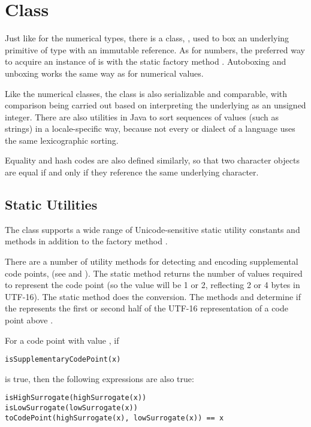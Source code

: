 \section{ Class}\label{section:character-class}

Just like for the numerical types, there is a class,
, used to box an underlying primitive
of type  with an immutable reference.  As for numbers, the
preferred way to acquire an instance of  is with the
static factory method .  Autoboxing and
unboxing works the same way as for numerical values.  

Like the numerical classes, the  class is also
serializable and comparable, with comparison being carried out based
on interpreting the underlying  as an unsigned integer.
There are also utilities in Java to sort sequences of 
values (such as strings) in a locale-specific way, because not every
or dialect of a language uses the same lexicographic sorting.

Equality and hash codes are also defined similarly, so that two
character objects are equal if and only if they reference the same
underlying character.

\subsection{Static Utilities}\label{section:char-character-utils}

The  class supports a wide range of Unicode-sensitive
static utility constants and methods in addition to the factory method
.

There are a number of utility methods for detecting and encoding
supplemental code points, (see  and ).
The static method  returns the number of  values
required to represent the code point (so the value will be 1 or 2,
reflecting 2 or 4 bytes in UTF-16).  
The static method  does the conversion.
The methods
 and  determine
if the  represents the first or second half of the UTF-16
representation of a code point above .  

For a code point with  value , if
\begin{verbatim} 
isSupplementaryCodePoint(x)
\end{verbatim} 
is true, then the following expressions are also true:
\begin{verbatim}
isHighSurrogate(highSurrogate(x))
isLowSurrogate(lowSurrogate(x))
toCodePoint(highSurrogate(x), lowSurrogate(x)) == x
\end{verbatim} 


